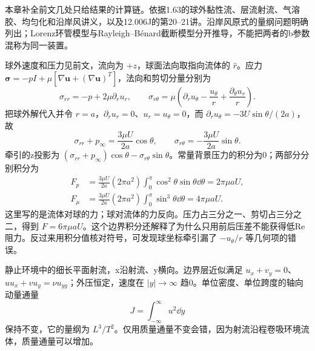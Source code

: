 本章补全前文几处只给结果的计算链。依据1.63的球外黏性流、层流射流、气溶胶、均匀化和沿岸风讲义，以及12.006J的第20--21讲。沿岸风原式的量纲问题明确列出；Lorenz环管模型与Rayleigh--Bénard截断模型分开推导，不能把两者的b参数混称为同一装置。

球外速度和压力见前文，流向为 $+z$，球面法向取指向流体的 $\hat r$。应力 $\boldsymbol\sigma=-pI+\mu[\nabla\mathbf u+(\nabla\mathbf u)^T]$，法向和剪切分量分别为
\[
 \sigma_{rr}=-p+2\mu\partial_r u_r,\qquad
 \sigma_{r\theta}=\mu\left(\partial_r u_\theta-\frac{u_\theta}{r}+\frac{\partial_\theta u_r}{r}\right).
\]
把球外解代入并令 $r=a$，$\partial_ru_r=0$、$u_r=u_\theta=0$，而 $\partial_ru_\theta=-3U\sin\theta/(2a)$，故
\[
 \sigma_{rr}+p_\infty=\frac{3\mu U}{2a}\cos\theta,
 \qquad \sigma_{r\theta}=-\frac{3\mu U}{2a}\sin\theta.
\]
牵引的z投影为 $(\sigma_{rr}+p_\infty)\cos\theta-\sigma_{r\theta}\sin\theta$。常量背景压力的积分为0；两部分分别积分为
\begin{align*}
 F_p&=\frac{3\mu U}{2a}(2\pi a^2)\int_0^\pi\cos^2\theta\sin\theta\dd\theta=2\pi\mu aU,\\
 F_\mu&=\frac{3\mu U}{2a}(2\pi a^2)\int_0^\pi\sin^3\theta\dd\theta=4\pi\mu aU.
\end{align*}
这里写的是流体对球的力；球对流体的力反向。压力占三分之一、剪切占三分之二，得到 $F=6\pi\mu aU$。这个边界积分还解释了为什么只用前后压差不能获得低Re阻力。反过来用积分值核对符号，可发现球坐标牵引漏了 $-u_\theta/r$ 等几何项的错误。

静止环境中的细长平面射流，x沿射流、y横向。边界层近似满足 $u_x+v_y=0$、$uu_x+vu_y=\nu u_{yy}$；外压恒定，速度在 $|y|\to\infty$ 趋0。单位密度、单位跨度的轴向动量通量
\[
 J=\int_{-\infty}^{\infty}u^2\dd y
\]
保持不变，它的量纲为 $L^3/T^2$。仅用质量通量不变会错，因为射流沿程卷吸环境流体，质量通量可以增加。

